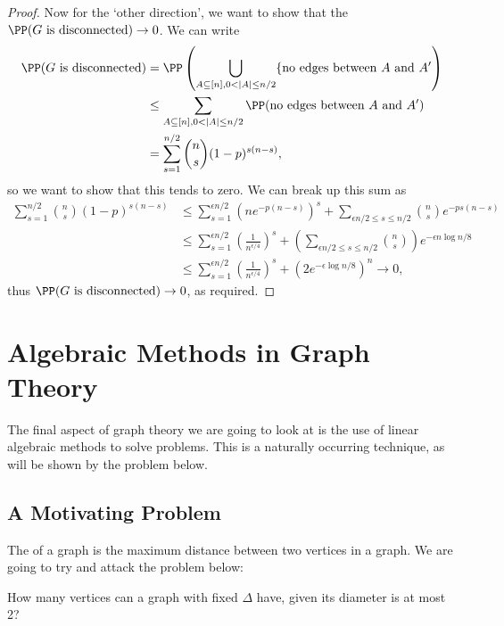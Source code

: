 \documentclass[a4paper]{scrartcl}
\begin{document}
\begin{proof}
	Now for the `other direction', we want to show that the $\PP(\text{$G$ is disconnected}) \rightarrow 0$. We can write
	\begin{align*}
		\PP(\text{$G$ is disconnected}) &= \PP\left(\bigcup_{A \subseteq [n], 0 <|A| \leq n/2} \{\text{no edges between $A$ and $A'$} \right) \\
		&\leq \sum_{A \subseteq [n], 0 <|A| \leq n/2} \PP(\text{no edges between $A$ and $A'$}) \\
		&= \sum_{s = 1}^{n/2} \binom{n}{s} (1 - p)^{s(n - s)},
	\end{align*}
	so we want to show that this tends to zero. We can break up this sum as
	\begin{align*}
		\sum_{s = 1}^{n/2} \binom{n}{s} (1 - p)^{s(n - s)} &\leq \sum_{s = 1}^{\epsilon n/2} \left(n e^{-p(n - s)}\right)^s+ \sum_{\epsilon n/2 \leq s \leq n/2} \binom{n}{s}e^{-ps(n - s)} \\
		&\leq \sum_{s = 1}^{\epsilon n/2} \left(\frac{1}{n^{\epsilon/4}}\right)^s+ \left(\sum_{\epsilon n/2 \leq s \leq n/2} \binom{n}{s} \right) e^{-\epsilon n \log n/8} \\
		&\leq \sum_{s = 1}^{\epsilon n/2} \left(\frac{1}{n^{\epsilon/4}}\right)^s+ \left(2 e^{-\epsilon \log n/8}\right)^n \longrightarrow 0,
	\end{align*}
	thus $\PP(\text{$G$ is disconnected}) \rightarrow 0$, as required.
\end{proof}

\section{Algebraic Methods in Graph Theory}

The final aspect of graph theory we are going to look at is the use of linear algebraic methods to solve problems. This is a naturally occurring technique, as will be shown by the problem below.

\subsection{A Motivating Problem}

The  of a graph is the maximum distance between two vertices in a graph. We are going to try and attack the problem below:
\begin{center}
	How many vertices can a graph with fixed $\Delta$ have, given its diameter is at most 2?
\end{center}
\end{document}
